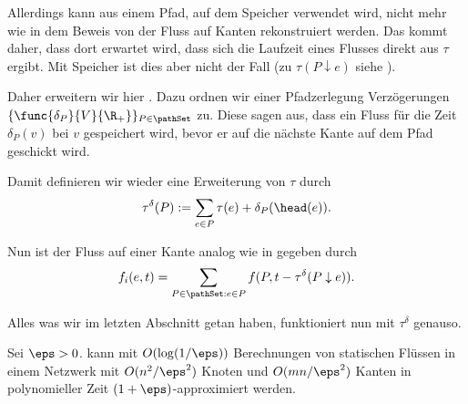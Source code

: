 Allerdings kann aus einem Pfad, auf dem Speicher verwendet wird, nicht mehr wie
in dem Beweis von  der Fluss auf Kanten rekonstruiert werden.
Das kommt daher, dass dort erwartet wird, dass sich die Laufzeit eines Flusses
direkt aus $\tau$ ergibt. Mit Speicher ist dies aber nicht der Fall
(zu $\tau(P \downarrow e)$ siehe ).

Daher erweitern wir hier . Dazu ordnen wir einer Pfadzerlegung
Verzögerungen $\{\func{\delta_P}{V}{\R_+}\}_{P \in \pathSet}$ zu. Diese sagen aus,
dass ein Fluss für die Zeit $\delta_P(v)$ bei $v$ gespeichert wird,
bevor er auf die nächste Kante auf dem Pfad geschickt wird.

Damit definieren wir wieder eine Erweiterung von $\tau$ durch
\[
    \tau^{\delta}(P) := \sum_{e \in P} \tau(e) + \delta_P(\head(e)).
\]

Nun ist der Fluss auf einer Kante analog wie in  gegeben durch
\[
    f_i(e, t) = \sum_{P \in \pathSet : e \in P}
                    f(P, t - \tau^{\delta}(P \downarrow e)) .
\]

Alles was wir im letzten Abschnitt getan haben, funktioniert nun mit $\tau^{\delta}$
genauso.



\begin{theorem}
    Sei $\eps > 0$.  kann mit $O(\log(1/\eps))$
    Berechnungen von statischen Flüssen in einem Netzwerk mit
    $O(n^2/\eps^2)$ Knoten und $O(mn/\eps^2)$ Kanten
    in polynomieller Zeit $(1+\eps)$-approximiert werden.
\end{theorem}


